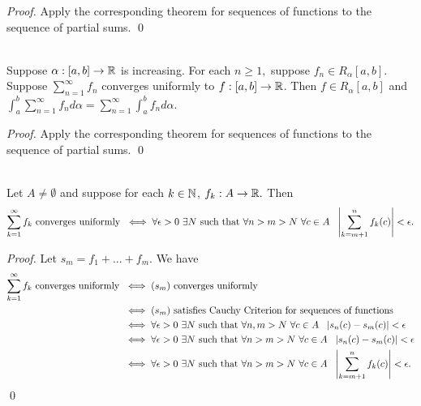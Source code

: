 \begin{proof}
    Apply the corresponding theorem for sequences of functions to the sequence of partial sums.
    \qed
\end{proof}

\begin{theorem} \leavevmode \\
    Suppose $\alpha: [a,b] \to \mathbb{R}$ is increasing. For each $n\geq 1,$ suppose $f_n \in R_\alpha[a,b]$. Suppose $\sum_{n=1}^\infty f_n$ converges uniformly to $f:[a,b] \to \mathbb{R}$. Then $f \in R_\alpha [a,b]$ and $\int_a^b \sum \limits_{n=1}^\infty f_n d\alpha = \sum \limits_{n=1}^\infty \int_a^b f_n d\alpha.$
\end{theorem}

\begin{proof}
    Apply the corresponding theorem for sequences of functions to the sequence of partial sums.
    \qed
\end{proof}

\begin{theorem} \leavevmode \\
    Let $A \neq \emptyset$ and suppose for each $k \in \mathbb{N}$, $f_k: A \to \mathbb{R}.$ Then
    \[\sum_{k=1}^\infty f_k \text{ converges uniformly } \iff \forall \epsilon > 0 ~\exists N \text{ such that } \forall n > m > N ~\forall c \in A ~~\left|\sum_{k=m+1}^n f_k(c)\right| < \epsilon.\]
\end{theorem}

\begin{proof}
    Let $s_m = f_1 + ... + f_m.$ We have
    \begin{align*}
        \sum_{k=1}^\infty f_k \text{ converges uniformly } &\iff (s_m) \text{ converges uniformly } \\
        &\iff (s_m) \text{ satisfies Cauchy Criterion for sequences of functions} \\ 
        &\iff \forall \epsilon > 0 ~\exists N \text{ such that } \forall n,m > N ~\forall c \in A ~~\left|s_n(c) - s_m(c)\right| < \epsilon \\
        &\iff \forall \epsilon > 0 ~\exists N \text{ such that } \forall n > m > N ~\forall c \in A ~~\left|s_n(c) - s_m(c)\right| < \epsilon \\
        &\iff \forall \epsilon > 0 ~\exists N \text{ such that } \forall n > m > N ~\forall c \in A ~~\left|\sum_{k=m+1}^nf_k(c)\right| < \epsilon.
    \end{align*}
    \qed
\end{proof}

